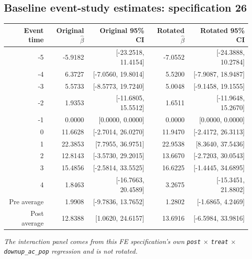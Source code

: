 \documentclass[10pt]{article}
\begin{document}
\subsection*{Baseline event-study estimates: specification 26}
\begin{center}
\scriptsize
\begin{tabular}{r rr rr}
\toprule
Event time & Original $\hat\beta$ & Original 95\% CI & Rotated $\hat\beta$ & Rotated 95\% CI \\
\midrule
-5 & -5.9182 & [-23.2518, 11.4154] & -7.0552 & [-24.3888, 10.2784] \\
-4 & 6.3727 & [-7.0560, 19.8014] & 5.5200 & [-7.9087, 18.9487] \\
-3 & 5.5733 & [-8.5773, 19.7240] & 5.0048 & [-9.1458, 19.1555] \\
-2 & 1.9353 & [-11.6805, 15.5512] & 1.6511 & [-11.9648, 15.2670] \\
-1 & 0.0000 & [0.0000, 0.0000] & 0.0000 & [0.0000, 0.0000] \\
0 & 11.6628 & [-2.7014, 26.0270] & 11.9470 & [-2.4172, 26.3113] \\
1 & 22.3853 & [7.7955, 36.9751] & 22.9538 & [8.3640, 37.5436] \\
2 & 12.8143 & [-3.5730, 29.2015] & 13.6670 & [-2.7203, 30.0543] \\
3 & 15.4856 & [-2.5814, 33.5525] & 16.6225 & [-1.4445, 34.6895] \\
4 & 1.8463 & [-16.7663, 20.4589] & 3.2675 & [-15.3451, 21.8802] \\
\midrule
Pre average & 1.9908 & [-9.7836, 13.7652] & 1.2802 & [-1.6865, 4.2469] \\
Post average & 12.8388 & [1.0620, 24.6157] & 13.6916 & [-6.5984, 33.9816] \\
\bottomrule
\end{tabular}
\end{center}
\medskip
\textit{The interaction panel comes from this FE specification's own \texttt{post} $\times$ \texttt{treat} $\times$ \texttt{downup\_ac\_pop} regression and is not rotated.}
\clearpage
\end{document}
